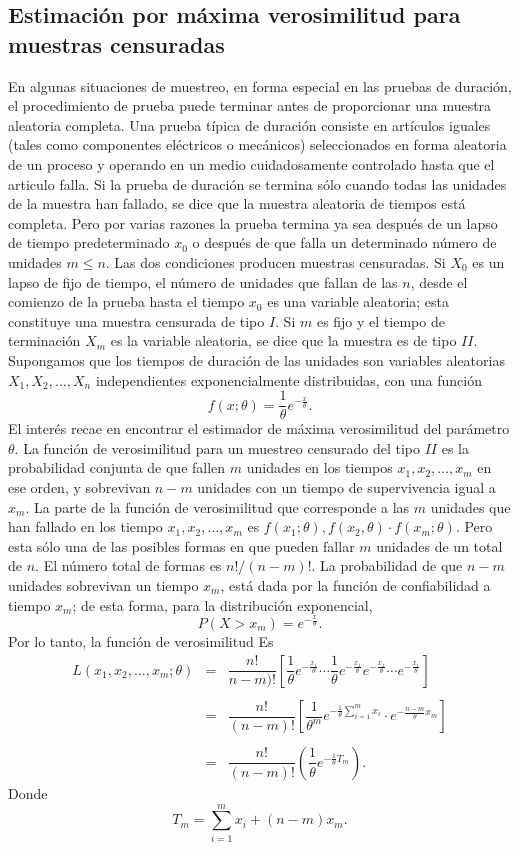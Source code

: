 \subsection{Estimación por máxima verosimilitud para muestras censuradas}
En algunas situaciones de muestreo, en forma especial en las pruebas de duración, el procedimiento de prueba puede terminar antes de proporcionar una muestra aleatoria completa. Una prueba típica de duración consiste en artículos iguales (tales como componentes eléctricos o mecánicos) seleccionados en forma aleatoria de un proceso y operando en un medio cuidadosamente controlado hasta que el articulo falla. Si la prueba de duración se termina sólo cuando todas las unidades de la muestra han fallado, se dice que la muestra aleatoria de tiempos está completa. Pero por varias razones la prueba termina ya sea después de un lapso de tiempo predeterminado $x_0$ o después de que falla un determinado número de unidades $m\leq n$. Las dos condiciones producen muestras censuradas. Si $X_0$ es un lapso de fijo de tiempo, el número de unidades que fallan de las $n$, desde el comienzo de la prueba hasta el tiempo $x_0$ es una variable aleatoria; esta constituye una muestra censurada de tipo $I$. Si $m$ es fijo y el tiempo de terminación $X_m$ es la variable aleatoria, se dice que la muestra es de tipo $II$. \\
Supongamos que los tiempos de duración de las unidades son variables aleatorias $X_1,X_2,\ldots,X_n$ independientes exponencialmente distribuidas, con una función 
$$f(x;\theta)=\dfrac{1}{\theta}e^{-\frac{x}{\theta}}.$$
El interés recae en encontrar el estimador de máxima verosimilitud del parámetro $\theta$. La función de verosimilitud para un muestreo censurado del tipo $II$ es la probabilidad conjunta de que fallen $m$ unidades en los tiempos $x_1,x_2,\ldots,x_m$ en ese orden, y sobrevivan $n-m$ unidades con un tiempo de supervivencia igual a $x_m$. La parte de la función de verosimilitud que corresponde a las $m$ unidades que han fallado en los tiempo $x_1,x_2,\ldots,x_m$ es $f(x_1;\theta),f(x_2,\theta)\cdot f(x_m;\theta)$. Pero esta sólo una de las posibles formas en que pueden fallar $m$ unidades de un total de $n$. El número total de formas es $n!/(n-m)!$. La probabilidad de que $n-m$ unidades sobrevivan un tiempo $x_m$, está dada por la función de confiabilidad a tiempo $x_m$; de esta forma, para la distribución exponencial,
$$P(X>x_m)=e^{-\frac{x}{\theta}}.$$
Por lo tanto, la función de verosimilitud Es
$$
\begin{array}{rcl}
    L(x_1,x_2,\ldots,x_m; \theta) &=& \dfrac{n!}{n-m)!}\left[\dfrac{1}{\theta}e^{-\frac{x_1}{\theta}}\cdots \dfrac{1}{\theta}e^{-\frac{x_1}{\theta}}e^{-\frac{x_1}{\theta}}\cdots e^{-\frac{x_1}{\theta}}\right]\\\\
				  &=& \dfrac{n!}{(n-m)!}\left[\dfrac{1}{\theta^m}e^{-\frac{1}{\theta}\sum\limits_{i=1}^m x_i}\cdot e^{-\frac{n-m}{\theta}x_m}\right]\\\\
				  &=& \dfrac{n!}{(n-m)!}\left(\dfrac{1}{\theta}e^{-\frac{1}{\theta}T_m}\right).
\end{array}
$$
Donde
$$T_m=\sum_{i=1}^m x_i+(n-m)x_m.$$

